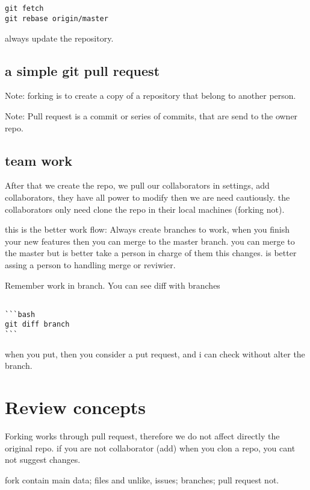 \documentclass[10pt,a4paper]{article}
\begin{document}
\begin{verbatim}


git fetch 
git rebase origin/master

\end{verbatim}


always update the repository.


\subsection{a simple git pull request}

Note: forking is to create a copy of a repository
that belong to another person.

Note: Pull request is a commit or series of commits, that are send to the owner repo.



\subsection{team work}
After that we create the repo, we pull our collaborators in settings,  add collaborators,
they have all power to modify then we are need cautiously.
the collaborators only need clone the repo in their local machines (forking not).


this is the better work flow:
Always create branches to work, when you finish your new features then you can merge to the master 
branch. you can merge to the master but is better take a person in charge of them this changes.
is better assing a person to handling merge or reviwier.

Remember work in branch.
You can see diff with branches 
\begin{verbatim}

```bash
git diff branch
```

\end{verbatim}
when you put, then you consider a put request, and i can check without alter the branch.


\section{Review concepts}

Forking works through pull request, therefore we do not affect directly the original repo.
if you are not collaborator (add) when you clon a repo, you cant not suggest changes.

fork contain main data; files and  unlike, issues; branches; pull request not.
\end{document}
